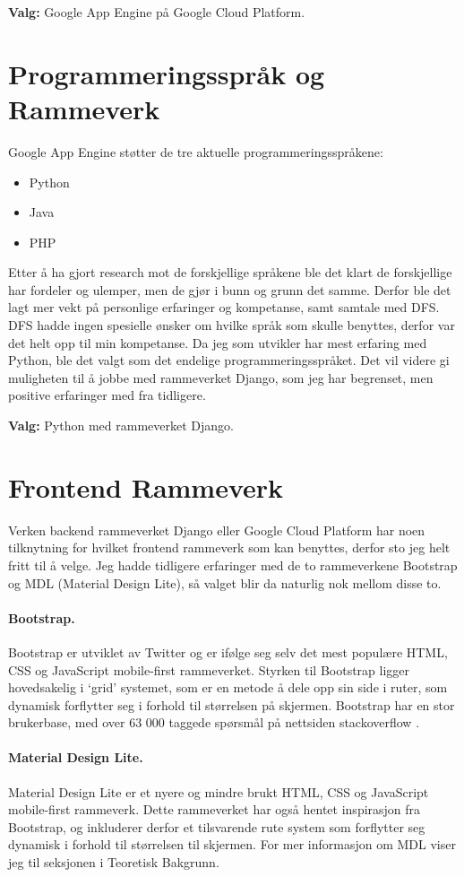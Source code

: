 \textbf{Valg:} Google App Engine på Google Cloud Platform.


\section{Programmeringsspråk og Rammeverk}
Google App Engine støtter de tre aktuelle programmeringsspråkene:
\begin{itemize}
\setlength\itemsep{0em}
\item Python
\item Java
\item PHP
\end{itemize}
Etter å ha gjort research mot de forskjellige språkene ble det klart de forskjellige har fordeler og ulemper, men de gjør i bunn og grunn det samme. Derfor ble det lagt mer vekt på personlige erfaringer og kompetanse, samt samtale med DFS. DFS hadde ingen spesielle ønsker om hvilke språk som skulle benyttes, derfor var det helt opp til min kompetanse.
Da jeg som utvikler har mest erfaring med Python, ble det valgt som det endelige programmeringsspråket. Det vil videre gi muligheten til å jobbe med rammeverket Django, som jeg har begrenset, men positive erfaringer med fra tidligere.

\textbf{Valg:} Python med rammeverket Django.

\clearpage
\section{Frontend Rammeverk}
Verken backend rammeverket Django eller Google Cloud Platform har noen tilknytning for hvilket frontend rammeverk som kan benyttes, derfor sto jeg helt fritt til å velge. Jeg hadde tidligere erfaringer med de to rammeverkene Bootstrap og MDL (Material Design Lite), så valget blir da naturlig nok mellom disse to.


\paragraph{Bootstrap.}Bootstrap er utviklet av Twitter og er ifølge seg selv det mest populære HTML, CSS og JavaScript mobile-first rammeverket. Styrken til Bootstrap ligger hovedsakelig i ‘grid’ systemet, som er en metode å dele opp sin side i ruter, som dynamisk forflytter seg i forhold til størrelsen på skjermen. Bootstrap har en stor brukerbase, med over 63 000 taggede spørsmål på nettsiden stackoverflow \citep{bootstrap:stackoverflow}.

\paragraph{Material Design Lite.}Material Design Lite er et nyere og mindre brukt HTML, CSS og JavaScript mobile-first rammeverk. Dette rammeverket har også hentet inspirasjon fra Bootstrap, og inkluderer derfor et tilsvarende rute system som forflytter seg dynamisk i forhold til størrelsen til skjermen. For mer informasjon om MDL viser jeg til seksjonen  i Teoretisk Bakgrunn.


